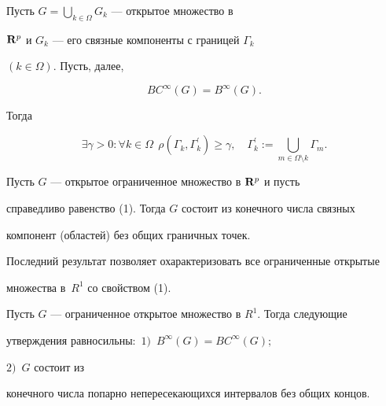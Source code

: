 \begin{cor}


Пусть $G=\bigcup\limits_{k\in \Omega}G_k$ --- открытое множество в


${\bold R}^p$ и $G_k$ --- его связные компоненты с границей $\Gamma_k$


$(k\in \Omega)$. Пусть, далее,


\begin{equation}


BC^{\infty}(G)=B^{\infty}(G).


\end{equation}


Тогда


\begin{equation}


\exists \gamma >0:


\forall k\in \Omega \ \ \rho(\Gamma_k,\Gamma_k^{\prime})\geqslant


\gamma, \quad\Gamma_k^{\prime}:=


\bigcup_{m\in \Omega \setminus k}\Gamma_m.


\end{equation}


\end{cor}








\begin{cor}


Пусть $G$ --- открытое ограниченное множество в ${\bold R}^p$ и пусть


справедливо равенство (1). Тогда $G$ состоит из конечного числа связных


компонент (областей) без общих граничных точек.


\end{cor}





Последний результат позволяет охарактеризовать все ограниченные открытые


множества в~$R^1$ со свойством (1).








\begin{thm}


Пусть $G$ --- ограниченное открытое множество в $R^1$. Тогда следующие


утверждения равносильны\/${:}$ $1)$~$B^{\infty}(G)=BC^{\infty}(G);$


$2)$~$G$ состоит из


конечного числа попарно непересекающихся интервалов без общих концов.


\end{thm}








